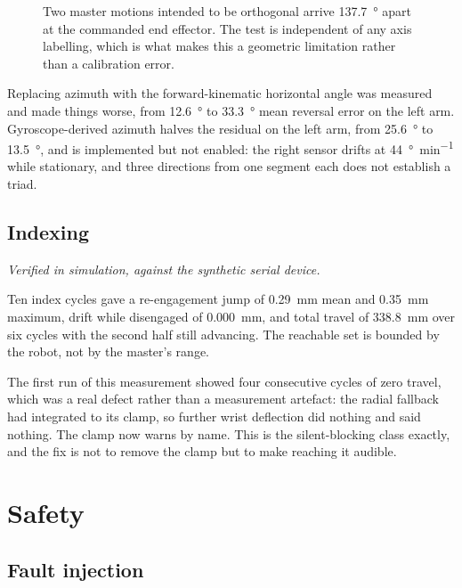 \begin{figure}[htbp]
  \centering
  
  \caption[The lateral constraint]{Two master motions intended to be
  orthogonal arrive \SI{137.7}{\degree} apart at the commanded end effector.
  The test is independent of any axis labelling, which is what makes this a
  geometric limitation rather than a calibration error.}
  \label{fig:lateral}
\end{figure}

Replacing azimuth with the forward-kinematic horizontal angle was measured and
made things worse, from \SI{12.6}{\degree} to \SI{33.3}{\degree} mean
reversal error on the left arm. Gyroscope-derived azimuth halves the residual
on the left arm, from \SI{25.6}{\degree} to \SI{13.5}{\degree}, and is
implemented but not enabled: the right sensor drifts at
\SI{44}{\degree\per\minute} while stationary, and three directions from one
segment each does not establish a triad.

\subsection{Indexing}

\emph{Verified in simulation, against the synthetic serial device.}

Ten index cycles gave a re-engagement jump of \SI{0.29}{\milli\metre} mean and
\SI{0.35}{\milli\metre} maximum, drift while disengaged of
\SI{0.000}{\milli\metre}, and total travel of \SI{338.8}{\milli\metre} over
six cycles with the second half still advancing. The reachable set is bounded
by the robot, not by the master's range.

The first run of this measurement showed four consecutive cycles of zero
travel, which was a real defect rather than a measurement artefact: the radial
fallback had integrated to its clamp, so further wrist deflection did nothing
and said nothing. The clamp now warns by name. This is the silent-blocking
class exactly, and the fix is not to remove the clamp but to make reaching it
audible.

\section{Safety}

\subsection{Fault injection}

